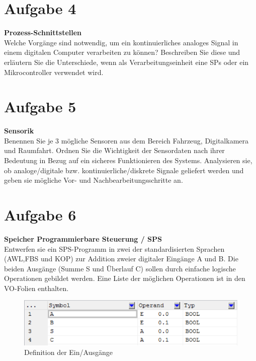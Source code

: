 \documentclass[12pt,a4paper,ngerman]{article}
\begin{document}
\pagebreak


\section{Aufgabe 4}
\begin{framed}
\textbf{Prozess-Schnittstellen} \\
Welche Vorgänge sind notwendig, um ein kontinuierliches analoges Signal in einem digitalen Computer verarbeiten zu können?
Beschreiben Sie diese und erläutern Sie die Unterschiede, wenn als Verarbeitungseinheit eine SPs oder ein Mikrocontroller verwendet wird. 
\end{framed}
\pagebreak




\section{Aufgabe 5}
\begin{framed}
\textbf{Sensorik} \\
Benennen Sie je 3 mögliche Sensoren aus dem Bereich Fahrzeug, Digitalkamera und Raumfahrt. Ordnen Sie die Wichtigkeit der Sensordaten nach ihrer Bedeutung in Bezug auf ein sicheres Funktionieren des Systems. Analysieren sie, ob analoge/digitale bzw. kontinuierliche/diskrete Signale geliefert werden und geben sie mögliche Vor- und Nachbearbeitungsschritte an. 
\end{framed}

\pagebreak

\section{Aufgabe 6}
\begin{framed}
\textbf{Speicher Programmierbare Steuerung / SPS} \\
Entwerfen sie ein SPS-Programm in zwei der standardisierten Sprachen (AWL,FBS und KOP) zur Addition zweier digitaler Eingänge A und B. Die beiden Ausgänge (Summe S und Überlauf C) sollen durch einfache logische Operationen gebildet werden. Eine Liste der möglichen Operationen ist in den VO-Folien enthalten.
\end{framed}
   
\begin{figure}[h!]
\centering
\includegraphics[scale=1]{figures/Aufg6_EA.png} 
\caption{Definition der Ein/Ausgänge}
\end{figure}
\end{document}
